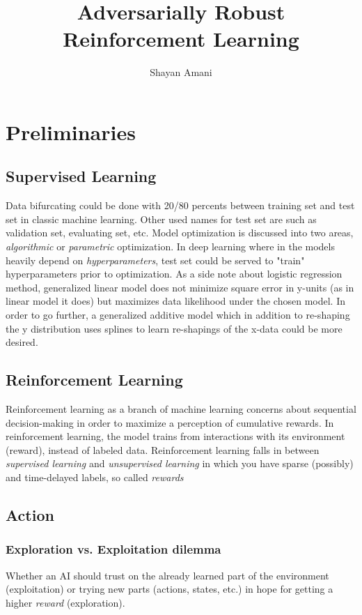 \documentclass[letterpaper,12pt]{article}
\title{Adversarially Robust Reinforcement Learning}
\author{Shayan Amani}
\begin{document}
    \maketitle


    \section{Preliminaries}

    \subsection{Supervised Learning}
    Data bifurcating could be done with 20/80 percents between training set and test set in classic machine learning. Other used names for test set are such as validation set, evaluating set, etc. Model optimization is discussed into two areas, \textit{algorithmic} or \textit{parametric} optimization. In deep learning where in the models heavily depend on \textit{hyperparameters}, test set could be served to "train" hyperparameters prior to optimization. As a side note about logistic regression method, generalized linear model does not minimize square error in y-units (as in linear model it does) but maximizes data likelihood under the chosen model. In order to go further, a generalized additive model which in addition to re-shaping the y distribution uses splines to learn re-shapings of the x-data could be more desired.

    \subsection{Reinforcement Learning}
    Reinforcement learning as a branch of machine learning concerns about sequential decision-making in order to maximize a perception of cumulative rewards. In reinforcement learning, the model trains from interactions with its environment (reward), instead of labeled data. Reinforcement learning falls in between \textit{supervised learning} and \textit{unsupervised learning} in which you have sparse (possibly) and time-delayed labels, so called \textit{rewards}

    \subsection{Action}

    \subsubsection{Exploration vs. Exploitation dilemma}
    Whether an AI should trust on the already learned part of the environment (exploitation) or trying new parts (actions, states, etc.) in hope for getting a higher \textit{reward} (exploration).
\end{document}
